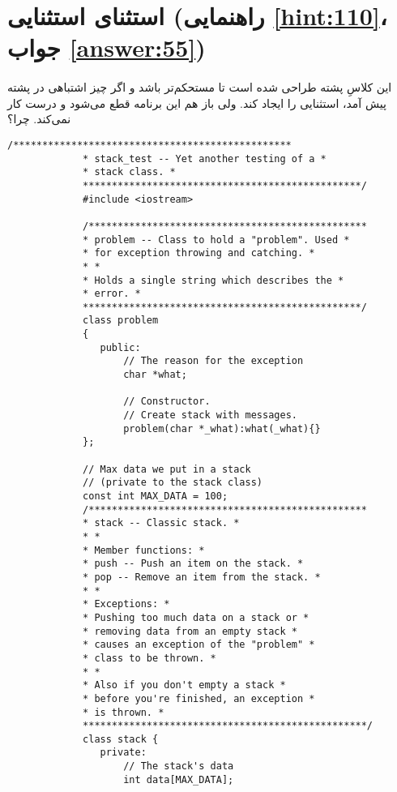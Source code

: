\section[استثنای استثنایی]{استثنای استثنایی \protect{} (راهنمایی \ref{hint:110}، جواب \ref{answer:55})}
\paragraph{}\label{prog:87}
این کلاسِ پشته طراحی شده است تا مستحکم‌تر باشد و اگر چیز اشتباهی در پشته پیش آمد، استثنایی را ایجاد کند. ولی باز هم این برنامه قطع می‌شود و درست کار نمی‌کند. چرا؟

\begin{LTR}
        \begin{lstlisting}[style=C++Style]
             /************************************************
             * stack_test -- Yet another testing of a *
             * stack class. *
             ************************************************/
             #include <iostream>

             /************************************************
             * problem -- Class to hold a "problem". Used *
             * for exception throwing and catching. *
             * *
             * Holds a single string which describes the *
             * error. *
             ************************************************/
             class problem
             {
             	public:
             		// The reason for the exception
             		char *what;

             		// Constructor.
             		// Create stack with messages.
             		problem(char *_what):what(_what){}
             };

             // Max data we put in a stack
             // (private to the stack class)
             const int MAX_DATA = 100;
             /************************************************
             * stack -- Classic stack. *
             * *
             * Member functions: *
             * push -- Push an item on the stack. *
             * pop -- Remove an item from the stack. *
             * *
             * Exceptions: *
             * Pushing too much data on a stack or *
             * removing data from an empty stack *
             * causes an exception of the "problem" *
             * class to be thrown. *
             * *
             * Also if you don't empty a stack *
             * before you're finished, an exception *
             * is thrown. *
             *************************************************/
             class stack {
             	private:
             		// The stack's data
             		int data[MAX_DATA];


\end{lstlisting}
\end{LTR}
